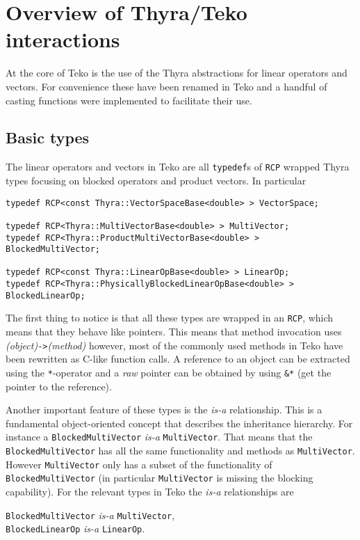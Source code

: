 \documentclass[12pt]{article}
\newcommand{\code}[1]{\lstinline[basicstyle=\footnotesize]!#1!}
\begin{document}
\section{Overview of Thyra/Teko interactions}\label{sec:thyra-pb}
At the core of Teko is the use of the Thyra abstractions for linear operators
and vectors. For convenience these have been renamed in Teko and a handful of casting
functions were implemented to facilitate their use. 

\subsection{Basic types}
The linear operators and vectors in Teko are all \code{typedef}s of 
\code{RCP} wrapped Thyra types focusing on blocked operators and product
vectors. In particular
\begin{framed}
\begin{lstlisting}
typedef RCP<const Thyra::VectorSpaceBase<double> > VectorSpace;

typedef RCP<Thyra::MultiVectorBase<double> > MultiVector;
typedef RCP<Thyra::ProductMultiVectorBase<double> > BlockedMultiVector;

typedef RCP<const Thyra::LinearOpBase<double> > LinearOp;
typedef RCP<Thyra::PhysicallyBlockedLinearOpBase<double> > BlockedLinearOp;
\end{lstlisting}
\end{framed}

The first thing to notice is that all these types are wrapped in an \code{RCP},
which means that they behave like pointers. This means that method invocation
uses \emph{(object)}\code{->}\emph{(method)} however, most of the commonly used
methods in Teko have been rewritten as C-like function calls.  A reference to an
object can be extracted using the \code{*}-operator and a \emph{raw} pointer can
be obtained by using \code{&*} (get the pointer to the reference).

Another important feature of these types is the \emph{is-a} relationship. This
is a fundamental object-oriented concept that describes the inheritance hierarchy.
For instance a \code{BlockedMultiVector} \emph{is-a} \code{MultiVector}. That means
that the \code{BlockedMultiVector} has all the same functionality and methods as
\code{MultiVector}. However \code{MultiVector} only has a subset of the functionality
of \code{BlockedMultiVector} (in particular \code{MultiVector} is missing the blocking
capability). For the relevant types in Teko the \emph{is-a} relationships are
\begin{center}
\code{BlockedMultiVector} \emph{is-a} \code{MultiVector}, \\
\code{BlockedLinearOp} \emph{is-a} \code{LinearOp}.
\end{center}
\end{document}

